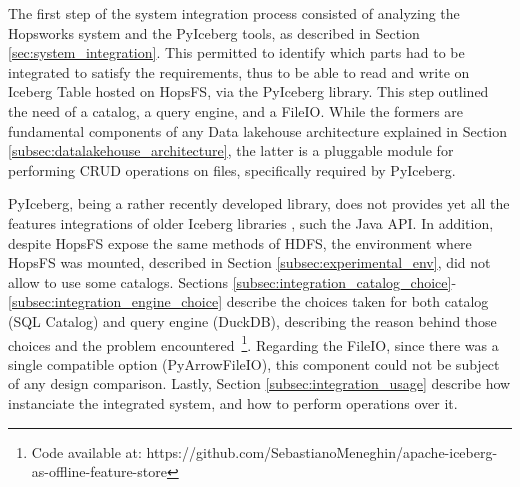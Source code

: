 The first step of the system integration process consisted of analyzing the Hopsworks system and the PyIceberg tools, as described in Section \ref{sec:system_integration}. This permitted to identify which parts had to be integrated to satisfy the requirements, thus to be able to read and write on Iceberg Table hosted on \gls{HopsFS}, via the PyIceberg library. This step outlined the need of a catalog, a query engine, and a FileIO. While the formers are fundamental components of any Data lakehouse architecture explained in Section \ref{subsec:datalakehouse_architecture}, the latter is a pluggable module for performing \gls{CRUD} operations on files, specifically required by PyIceberg.

PyIceberg, being a rather recently developed library, does not provides yet all the features integrations of older Iceberg libraries \cite{iceberg_tech_docs}, such the Java \gls{API}. In addition, despite \gls{HopsFS} expose the same methods of \gls{HDFS}, the environment where HopsFS was mounted, described in Section \ref{subsec:experimental_env}, did not allow to use some catalogs. Sections \ref{subsec:integration_catalog_choice}-\ref{subsec:integration_engine_choice} describe the choices taken for both catalog (SQL Catalog) and query engine (DuckDB), describing the reason behind those choices and the problem encountered~\footnote{Code available at: https://github.com/SebastianoMeneghin/apache-iceberg-as-offline-feature-store}. Regarding the FileIO, since there was a single compatible option (PyArrowFileIO), this component could not be subject of any design comparison. Lastly, Section \ref{subsec:integration_usage} describe how instanciate the integrated system, and how to perform operations over it.

